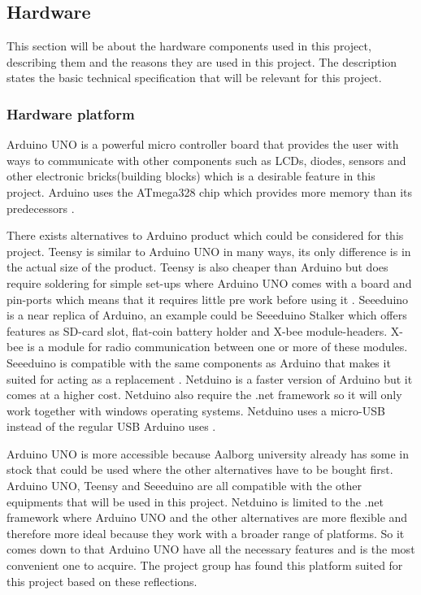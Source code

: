 \subsection{Hardware}
This section will be about the hardware components used in this project, describing them and the reasons they are used in this project. The description states the basic technical specification that will be relevant for this project.

\subsubsection{Hardware platform}
\label{sec:hardwarearduino}
Arduino UNO is a powerful micro controller board that provides the user with ways to communicate with other components such as LCDs, diodes, sensors and other electronic bricks(building blocks) which is a desirable feature in this project. Arduino uses the ATmega328 chip which provides more memory than its predecessors \citep{ArduinoUno}.

There exists alternatives to Arduino product which could be considered for this project. Teensy is similar to Arduino UNO in many ways, its only difference is in the actual size of the product. Teensy is also cheaper than Arduino but does require soldering for simple set-ups where Arduino UNO comes with a board and pin-ports which means that it requires little pre work before using it \citep{Teensy}.
Seeeduino is a near replica of Arduino, an example could be Seeeduino Stalker which offers features as SD-card slot, flat-coin battery holder and X-bee module-headers. X-bee is a module for radio communication between one or more of these modules. Seeeduino is compatible with the same components as 
Arduino that makes it suited for acting as a replacement \citep{Seedui}.
Netduino is a faster version of Arduino but it comes at a higher cost. Netduino also require the .net framework so it will only work together with windows operating systems. Netduino uses a micro-USB instead of the regular USB Arduino uses \citep{Netdui}.

Arduino UNO is more accessible because Aalborg university already has some in stock that could be used where the other alternatives have to be bought first. Arduino UNO, Teensy and Seeeduino are all compatible with the other equipments that will be used in this project. Netduino is limited to the .net framework where Arduino UNO and the other alternatives are more flexible and therefore more ideal because they work with a broader range of platforms.
So it comes down to that Arduino UNO have all the necessary features and is the most convenient one to acquire. The project group has found this platform suited for this project based on these reflections. 

